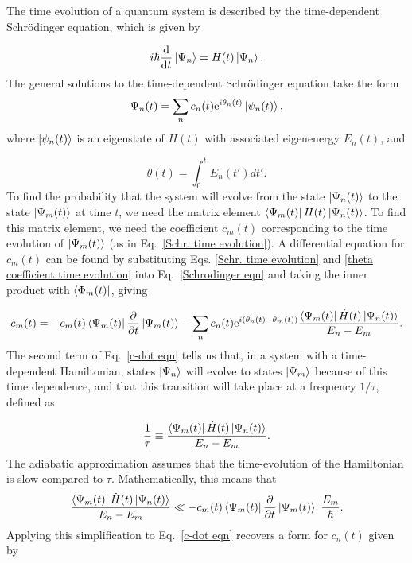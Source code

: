 \documentclass[double,12pt,1in,seploa]{beavtex}
\begin{document}
The time evolution of a quantum system is described by the time-dependent Schrödinger equation, which is given by

\begin{equation}
    i \hbar \derivative{t}\ket{\Psi_n} = H(t)\ket{\Psi_n}. \label{Schrodinger eqn}
\end{equation}
The general solutions to the time-dependent Schrödinger equation take the form
\begin{equation}
    {\Psi_n(t)} = \sum_n c_n(t) \mathrm{e}^{i \theta_n(t)} \ket{\psi_n(t)}, \label{Schr. time evolution}
\end{equation}
where $\ket{\psi_n(t)}$ is an eigenstate of $H(t)$ with associated eigenenergy $E_n(t)$, and 

\begin{equation}
    \theta(t) = \int_{0}^{t}E_n(t')dt'. \label{theta coefficient time evolution}
\end{equation}
To find the probability that the system will evolve from the state $\ket{\Psi_n(t)}$ to the state $\ket{\Psi_m(t)}$ at time $t$, we need the matrix element $\bra{\Psi_m(t)}H(t)\ket{\Psi_n(t)}$. To find this matrix element, we need the coefficient $c_m(t)$ corresponding to the time evolution of $\ket{\Psi_m(t)}$ (as in Eq.\ \ref{Schr. time evolution}). A differential equation for $c_m(t)$ can be found by substituting Eqs. \ref{Schr. time evolution} and \ref{theta coefficient time evolution} into Eq.\ \ref{Schrodinger eqn} and taking the inner product with $\bra{\Phi_m(t)}$, giving \cite[p.\ 347]{sakurai_modern_1985}

\begin{equation}
    \dot{c}_m(t) = - c_m(t) \bra{\Psi_m(t)}\pdv{t}\ket{\Psi_m(t)} - \sum_n c_n(t) \mathrm{e}^{i (\theta_n(t) - \theta_m(t))} \frac{\bra{\Psi_m(t)}\dot{H}(t)\ket{\Psi_n(t)}}{E_n - E_m}. \label{c-dot eqn}
\end{equation}
The second term of Eq.\ \ref{c-dot eqn} tells us that, in a system with a time-dependent Hamiltonian, states $\ket{\Psi_n}$ will evolve to states $\ket{\Psi_m}$ because of this time dependence, and that this transition will take place at a frequency $1/\tau$, defined as 

\begin{equation}
    \frac{1}{\tau} \equiv \frac{\bra{\Psi_m(t)}\dot{H}(t)\ket{\Psi_n(t)}}{E_n - E_m}.
\end{equation}
The adiabatic approximation assumes that the time-evolution of the Hamiltonian is slow compared to $\tau$. Mathematically, this means that
\begin{equation}
    \frac{\bra{\Psi_m(t)}\dot{H}(t)\ket{\Psi_n(t)}}{E_n - E_m} \ll - c_m(t) \bra{\Psi_m(t)}\pdv{t}\ket{\Psi_m(t)} ~ \frac{E_m}{\hbar}.
\end{equation}
Applying this simplification to Eq.\ \ref{c-dot eqn} recovers a form for $c_n(t)$ given by
\end{document}
